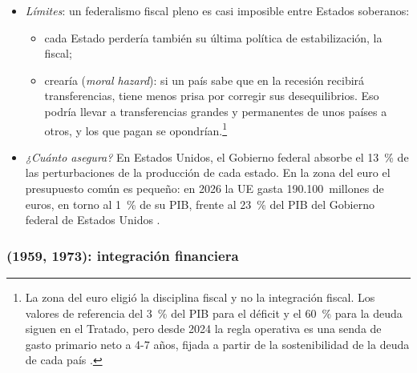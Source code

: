 \documentclass[11pt]{article}
\begin{document}
\begin{itemize}
\begin{itemize}
{\begin{itemize}
\end{itemize}
En el ejemplo, que parte del superávit que el auge da a Alemania financie el déficit que la recesión da a España; sin integración fiscal, es inviable políticamente. \textcite{Eichengreen1990One} estudia estas funciones en el federalismo fiscal de Estados Unidos como referencia para Europa.}
  \item un \emph{mecanismo de protección}: la deuda de los gobiernos nacionales pasa a ser deuda de la unión. Desaparecen los movimientos de capital desestabilizadores de un mercado de bonos a otro, y el gobierno de la unión se endeuda en una moneda que controla, así que se evitan las crisis de liquidez.
  \end{itemize}
\item \emph{Límites}: un federalismo fiscal pleno es casi imposible entre Estados soberanos:
  \begin{itemize}
  \item cada Estado perdería también su última política de estabilización, la fiscal;
  \item crearía  (\emph{moral hazard}): si un país sabe que en la recesión recibirá transferencias, tiene menos prisa por corregir sus desequilibrios. Eso podría llevar a transferencias grandes y permanentes de unos países a otros, y los que pagan se opondrían.\footnote{La zona del euro eligió la disciplina fiscal y no la integración fiscal. Los valores de referencia del 3~\% del PIB para el déficit y el 60~\% para la deuda siguen en el Tratado\nocite{UE2016Protocolo12}, pero desde 2024 la regla operativa es una senda de gasto primario neto a 4-7 años, fijada a partir de la sostenibilidad de la deuda de cada país\nocite{UE2024Reglamento1263} .}
  \end{itemize}
\item \emph{¿Cuánto asegura?} En Estados Unidos, el Gobierno federal absorbe el 13~\% de las perturbaciones de la producción de cada estado\nocite{AsdrubaliSorensenYosha1996Channels}. En la zona del euro el presupuesto común es pequeño: en 2026 la UE gasta 190.100~millones de euros, en torno al 1~\% de su PIB\nocite{PE2025Presupuesto2026Prensa,Eurostat2026Nama10gdp}, frente al 23~\% del PIB del Gobierno federal de Estados Unidos\nocite{CBO2026MBR}  .
\end{itemize}

\subsubsection{ (1959, 1973): integración financiera}\label{sec:ingram}
\end{document}

